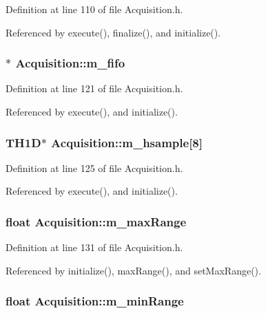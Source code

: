 Definition at line 110 of file Acquisition.h.

Referenced by execute(), finalize(), and initialize().\hypertarget{classAcquisition_a8a893e7485e96da01185df6d1109c0bc}{
\subsubsection[{m\_\-fifo}]{$\ast$ {\bf Acquisition::m\_\-fifo}}}
\label{classAcquisition_a8a893e7485e96da01185df6d1109c0bc}


Definition at line 121 of file Acquisition.h.

Referenced by execute(), and initialize().\hypertarget{classAcquisition_a53bcc000575de30eba6b7db8209be2cc}{
\subsubsection[{m\_\-hsample}]{\setlength{\rightskip}{0pt plus 5cm}TH1D$\ast$ {\bf Acquisition::m\_\-hsample}\mbox{[}8\mbox{]}}}
\label{classAcquisition_a53bcc000575de30eba6b7db8209be2cc}


Definition at line 125 of file Acquisition.h.

Referenced by execute(), and initialize().\hypertarget{classAcquisition_a45478629e9db582470b4b158edb46616}{
\subsubsection[{m\_\-maxRange}]{\setlength{\rightskip}{0pt plus 5cm}float {\bf Acquisition::m\_\-maxRange}}}
\label{classAcquisition_a45478629e9db582470b4b158edb46616}


Definition at line 131 of file Acquisition.h.

Referenced by initialize(), maxRange(), and setMaxRange().\hypertarget{classAcquisition_a06b3ea027ebdcb15f64a6517ceb99b76}{
\subsubsection[{m\_\-minRange}]{\setlength{\rightskip}{0pt plus 5cm}float {\bf Acquisition::m\_\-minRange}}}
\label{classAcquisition_a06b3ea027ebdcb15f64a6517ceb99b76}


